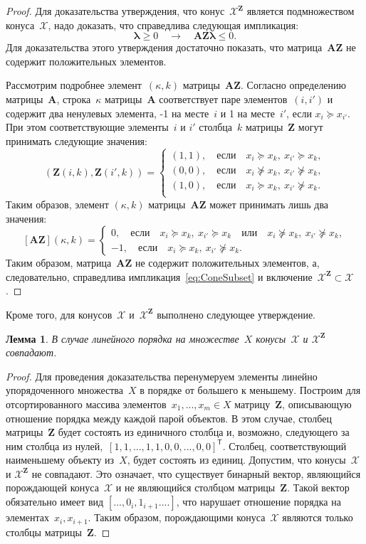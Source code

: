 \documentclass{elsarticle}
\newcommand{\bZ}{\mathbf{Z}}
\newcommand{\bA}{\mathbf{A}}
\newcommand{\blambda}{\boldsymbol{\lambda}}
\newcommand{\cX}{\mathcal{X}}
\newcommand{\T}{^{\mathsf{T}}}
\newtheorem{lemm}{Лемма}
\begin{document}
\begin{proof}
Для доказательства утверждения, что конус~$\cX^{\bZ}$ является подмножеством конуса~$\cX$, надо доказать, что справедлива следующая импликация:
\begin{equation}
\blambda\geq 0 \quad \rightarrow \quad \bA\bZ\blambda \leq 0.
\label{eq:ConeSubset}
\end{equation}
Для доказательства этого утверждения достаточно показать, что матрица~$\bA\bZ$ не содержит положительных элементов.

Рассмотрим подробнее элемент~$(\kappa,k)$ матрицы~$\bA\bZ$. Согласно определению матрицы~$\bA$, строка~$\kappa$ матрицы~$\bA$ соответствует паре элементов~$(i,i')$ и содержит два ненулевых элемента, -1 на месте~$i$ и 1 на месте~$i'$, если $x_i\succeq x_{i'}$. При этом соответствующие элементы~$i$ и $i'$ столбца~$k$ матрицы~$\bZ$ могут принимать следующие значения:
\[
(\bZ(i,k),\bZ(i',k))=
\begin{cases}
(1,1),\quad\text{если}\quad x_i\succeq x_k,~x_{i'}\succeq x_k,\\
(0,0),\quad\text{если}\quad x_i\nsucceq x_k,~x_{i'}\nsucceq x_k,\\
(1,0),\quad\text{если}\quad x_i\succeq x_k,~x_{i'}\nsucceq x_k.\\
\end{cases}
\]
Таким образов, элемент $(\kappa,k)$ матрицы~$\bA\bZ$ может принимать лишь два значения:
\[
[\bA\bZ](\kappa,k)=
\begin{cases}
0, \quad\text{если}\quad x_i\succeq x_k,~x_{i'}\succeq x_k \quad \text{или} \quad x_i\nsucceq x_k,~x_{i'}\nsucceq x_k,\\
-1,\quad\text{если}\quad x_i\succeq x_k,~x_{i'}\nsucceq x_k.
\end{cases}
\]
Таким образом, матрица~$\bA\bZ$ не содержит положительных элементов, а, следовательно, справедлива импликация~\eqref{eq:ConeSubset} и включение~$\cX^{\bZ}\subset \cX$.
\end{proof}

Кроме того, для конусов~$\cX$ и~$\cX^{\bZ}$ выполнено следующее утверждение.
\begin{lemm}
\label{lem:ConeEquivLinear}
В случае линейного порядка на множестве~$X$ конусы~$\cX$ и $\cX^{\bZ}$ совпадают.
\end{lemm}
\begin{proof}
Для проведения доказательства перенумеруем элементы линейно упорядоченного множества~$X$ в порядке от большего к меньшему. Построим для отсортированного массива элементов~$x_1,...,x_m\in X$ матрицу~$\bZ$, описывающую отношение порядка между каждой парой объектов. В этом случае, столбец матрицы~$\bZ$ будет состоять из единичного столбца и, возможно, следующего за ним столбца из нулей,~$[1,1,...,1,1,0,0,...,0,0]\T$. Столбец, соответствующий наименьшему объекту из~$X$, будет состоять из единиц.
Допустим, что конусы~$\cX$ и $\cX^{\bZ}$ не совпадают. Это означает, что существует бинарный вектор, являющийся порождающей конуса~$\cX$ и не являющийся столбцом матрицы~$\bZ$. Такой вектор обязательно имеет вид $[...,0_i,1_{i+1}....]$, что нарушает отношение порядка на элементах~$x_i,x_{i+1}$. Таким образом, порождающими конуса~$\cX$ являются только столбцы матрицы~$\bZ$.
\end{proof}
\end{document}
